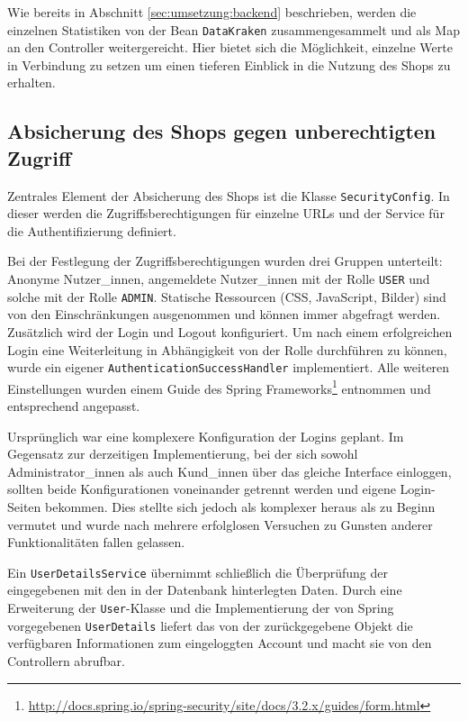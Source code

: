 	Wie bereits in Abschnitt \ref{sec:umsetzung:backend} beschrieben, werden die einzelnen Statistiken von der Bean \lstinline|DataKraken| zusammengesammelt und als Map an den Controller weitergereicht. Hier bietet sich die Möglichkeit, einzelne Werte in Verbindung zu setzen um einen tieferen Einblick in die Nutzung des Shops zu erhalten.
	
	\subsection{Absicherung des Shops gegen unberechtigten Zugriff}
	Zentrales Element der Absicherung des Shops ist die Klasse \lstinline|SecurityConfig|. In dieser werden die Zugriffsberechtigungen für einzelne URLs und der Service für die Authentifizierung definiert.
	
	Bei der Festlegung der Zugriffsberechtigungen wurden drei Gruppen unterteilt: Anonyme Nutzer\_innen, angemeldete Nutzer\_innen mit der Rolle \lstinline|USER| und solche mit der Rolle \lstinline|ADMIN|. Statische Ressourcen (CSS, JavaScript, Bilder) sind von den Einschränkungen ausgenommen und können immer abgefragt werden. Zusätzlich wird der Login und Logout konfiguriert. Um nach einem erfolgreichen Login eine Weiterleitung in Abhängigkeit von der Rolle durchführen zu können, wurde ein eigener \lstinline|AuthenticationSuccessHandler| implementiert. Alle weiteren Einstellungen wurden einem Guide des Spring Frameworks\footnote{\hyperlink{http://docs.spring.io/spring-security/site/docs/3.2.x/guides/form.html}{http://docs.spring.io/spring-security/site/docs/3.2.x/guides/form.html}} entnommen und entsprechend angepasst.
	
	Ursprünglich war eine komplexere Konfiguration der Logins geplant. Im Gegensatz zur derzeitigen Implementierung, bei der sich sowohl Administrator\_innen als auch Kund\_innen über das gleiche Interface einloggen, sollten beide Konfigurationen voneinander getrennt werden und eigene Login-Seiten bekommen. Dies stellte sich jedoch als komplexer he\-raus als zu Beginn vermutet und wurde nach mehrere erfolglosen Versuchen zu Gunsten anderer Funktionalitäten fallen gelassen.
	
	Ein \lstinline{UserDetailsService} übernimmt schließlich die Überprüfung der eingegebenen mit den in der Datenbank hinterlegten Daten. Durch eine Erweiterung der \lstinline{User}-Klasse und die Implementierung der von Spring vorgegebenen \lstinline{UserDetails} liefert das von der zurückgegebene Objekt die verfügbaren Informationen zum eingeloggten Account und macht sie von den Controllern abrufbar.
		
